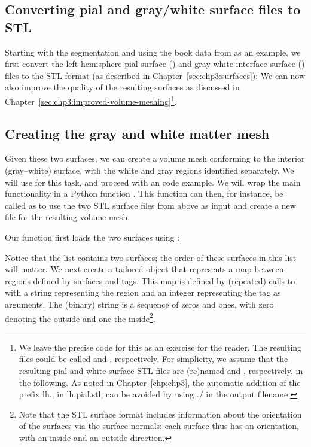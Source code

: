 \subsection{Converting pial and gray/white surface files to STL}
Starting with the \freesurfer{} segmentation and using the book data
from  as an example, we first convert the
left hemisphere pial surface () and gray-white interface
surface () files to the STL format (as described in
Chapter~\ref{sec:chp3:surfaces}):
\noindent We can now also improve the quality of the resulting
surfaces as discussed in
Chapter~\ref{sec:chp3:improved-volume-meshing}\footnote{We leave the
  precise code for this as an exercise for the reader. The resulting
  files could be called  and
  , respectively. For simplicity, we assume that the
  resulting pial and white surface STL files are (re)named
   and , respectively, in the following. As 
  noted in Chapter~\ref{chp:chp3}, the automatic addition of the prefix lh., in
  lh.pial.stl, can be avoided by using ./ in the output filename.}.

\subsection{Creating the gray and white matter mesh}
Given these two surfaces, we can create a volume mesh conforming to
the interior (gray--white) surface, with the white and gray regions
identified separately. We will use \svmtk{} for this task, and
proceed with an \svmtk{} code example. We will wrap the main
functionality in a Python function
. This function can then, for instance,
be called as
to use the two STL surface files from above as input and create a new
file  for the resulting volume mesh.

Our function first loads the two surfaces using \svmtk{}:

\noindent Notice that the list  contains 
two surfaces; the order of these surfaces in this list will matter.  We next 
create a tailored \svmtk{}  object that represents 
a map between regions defined by surfaces and tags. This map is defined by
(repeated) calls to  with a string representing the
region and an integer representing the tag as arguments. The (binary)
string is a sequence of zeros and ones, with zero denoting the outside
and one the inside\footnote{Note that the STL surface 
format includes information about the orientation of the surfaces via the 
surface normals: each surface thus has an orientation, with an inside and an 
outside direction.}.

